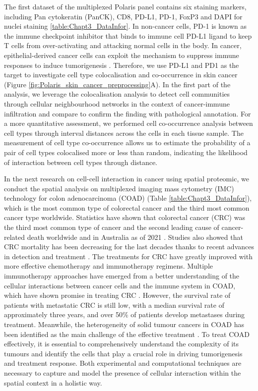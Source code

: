 The first dataset of the multiplexed Polaris panel contains six staining markers, including Pan cytokeratin (PanCK), CD8, PD-L1, PD-1, FoxP3 and DAPI for nuclei staining \ref{table:Chapt3_DataInfor}. In non-cancer cells, PD-1 is known as the immune checkpoint inhibitor that binds to immune cell PD-L1 ligand to keep T cells from over-activating and attacking normal cells in the body. In cancer, epithelial-derived cancer cells can exploit the mechanism to suppress immune responses to induce tumorigenesis \cite{tsai2014pd, chen2013oncology}. Therefore, we use PD-L1 and PD1 as the target to investigate cell type colocalisation and co-occurrence in skin cancer (Figure \ref{fig:Polaris_skin_cancer_preprocessing}A). In the first part of the analysis, we leverage the colocalisation analysis to detect cell communities through cellular neighbourhood networks in the context of cancer-immune infiltration and compare to confirm the finding with pathological annotation. For a more quantitative assessment, we performed cell co-occurrence analysis between cell types through interval distances across the cells in each tissue sample. The measurement of cell type co-occurrence allows us to estimate the probability of a pair of cell types colocalised more or less than random, indicating the likelihood of interaction between cell types through distance. 

In the next research on cell-cell interaction in cancer using spatial proteomic, we conduct the spatial analysis on multiplexed imaging mass cytometry (IMC) technology for colon adenocarcinoma (COAD) (Table \ref{table:Chapt3_DataInfor}), which is the most common type of colorectal cancer and the third most common cancer type worldwide\cite{wang2022identification, siegel2021cancer}. Statistics have shown that colorectal cancer (CRC) was the third most common type of cancer and the second leading cause of cancer-related death worldwide and in Australia as of 2021 \cite{siegel2021cancer, aihwcoad2018statistics}. Studies also showed that CRC mortality has been decreasing for the last decades thanks to recent advances in detection and treatment \cite{ouakrim2015trends}. The treatments for CRC have greatly improved with more effective chemotherapy and immunotherapy regimens. Multiple immunotherapy approaches have emerged from a better understanding of the cellular interactions between cancer cells and the immune system in COAD, which have shown promise in treating CRC \cite{ciardiello2019immunotherapy}. However, the survival rate of patients with metastatic CRC is still low, with a median survival rate of approximately three years, and over 50\% of patients develop metastases during treatment\cite{aihwcoad2018statistics,dulskas2020improvement, spallanzani2018immunotherapy}. Meanwhile, the heterogeneity of solid tumour cancers in COAD has been identified as the main challenge of the effective treatment \cite{ciardiello2019immunotherapy, mathonnet2014hallmarks}. To treat COAD effectively, it is essential to comprehensively understand the complexity of its tumours and identify the cells that play a crucial role in driving tumorigenesis and treatment response. Both experimental and computational techniques are necessary to capture and model the presence of cellular interaction within the spatial context in a holistic way.  

